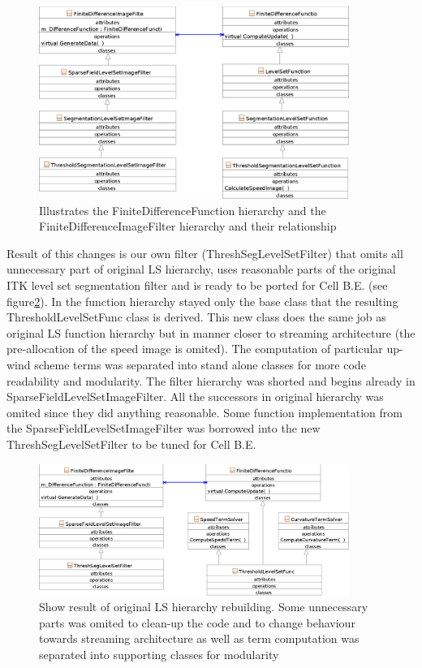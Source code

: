 \begin{figure}
    \centering
    \includegraphics[width=0.9\textwidth]{data/originalHierarchy}
    \caption[Original ITK thresholding level set filter class hierarchy]
{Illustrates the FiniteDifferenceFunction hierarchy and the FiniteDifferenceImageFilter hierarchy and their relationship}
    \label{fg:originalHierarchy}
\end{figure}

Result of this changes is our own filter (ThreshSegLevelSetFilter) that omits all unnecessary part of original LS hierarchy, uses reasonable parts of the original ITK level set segmentation filter and is ready to be ported for Cell B.E. (see figure\ref{fg:resultingFilter}).
In the function hierarchy stayed only the base class that the resulting ThresholdLevelSetFunc class is derived.
This new class does the same job as original LS function hierarchy but in manner closer to streaming architecture (the pre-allocation of the speed image is omited).
The computation of particular up-wind scheme terms was separated into stand alone classes for more code readability and modularity.
The filter hierarchy was shorted and begins already in SparseFieldLevelSetImageFilter.
All the successors in original hierarchy was omited since they did anything reasonable.
Some function implementation from the SparseFieldLevelSetImageFilter was borrowed into the new ThreshSegLevelSetFilter to be tuned for Cell B.E.

\begin{figure}
    \centering
    \includegraphics[width=0.9\textwidth]{data/resultingFilter}
    \caption[Resulting level set filter ready to be ported to Cell B.E.]
    {
Show result of original LS hierarchy rebuilding.
Some unnecessary parts was omited to clean-up the code and to change behaviour towards streaming architecture as well as term computation was separated into supporting classes for modularity
    }
    \label{fg:resultingFilter}
\end{figure}

